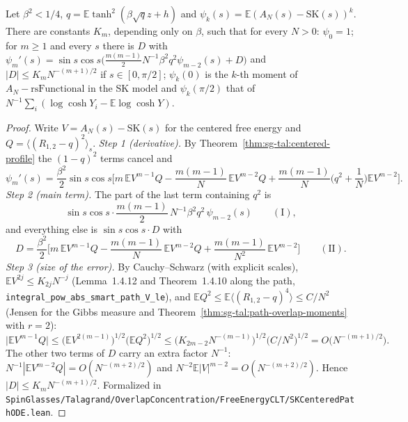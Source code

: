 \begin{theorem}\label{thm:sg-tal:centered-ode}
  \leanok
{}
Let $\beta^2<1/4$, $q=\mathbb E\tanh^2(\beta\sqrt q z+h)$ and $\psi_k(s)=\mathbb E(A_N(s)-\mathrm{SK}(s))^k$. There are constants $K_m$, depending only on $\beta$, such that for every $N>0$: $\psi_0=1$; for $m\ge1$ and every $s$ there is $D$ with $\psi_m'(s)=\sin s\cos s\big(\frac{m(m-1)}2N^{-1}\beta^2q^2\psi_{m-2}(s)+D\big)$ and $|D|\le K_mN^{-(m+1)/2}$ if $s\in[0,\pi/2]$; $\psi_k(0)$ is the $k$-th moment of $A_N-\mathrm{rsFunctional}$ in the SK model and $\psi_k(\pi/2)$ that of $N^{-1}\sum_i(\log\cosh Y_i-\mathbb E\log\cosh Y)$.
\end{theorem}
\begin{proof}
  \leanok
Write $V=A_N(s)-\mathrm{SK}(s)$ for the centered free energy and $Q=\langle(R_{1,2}-q)^2\rangle_s$.
\emph{Step 1 (derivative).} By Theorem~\ref{thm:sg-tal:centered-profile} the $(1-q)^2$ terms cancel and
\[
\psi_m'(s)=\frac{\beta^2}2\sin s\cos s\Big[m\,\mathbb{E}V^{m-1}Q-\frac{m(m-1)}N\,\mathbb{E}V^{m-2}Q+\frac{m(m-1)}N\Big(q^2+\frac1N\Big)\mathbb{E}V^{m-2}\Big].
\]
\emph{Step 2 (main term).} The part of the last term containing $q^2$ is
\[
\sin s\cos s\cdot\frac{m(m-1)}2\,N^{-1}\beta^2q^2\,\psi_{m-2}(s)\qquad(\mathrm I),
\]
and everything else is $\sin s\cos s\cdot D$ with
\[
D=\frac{\beta^2}2\Big[m\,\mathbb{E}V^{m-1}Q-\frac{m(m-1)}N\,\mathbb{E}V^{m-2}Q+\frac{m(m-1)}{N^2}\,\mathbb{E}V^{m-2}\Big]\qquad(\mathrm{II}).
\]
\emph{Step 3 (size of the error).} By Cauchy--Schwarz (with explicit scales), $\mathbb{E}V^{2j}\le K_{2j}N^{-j}$ (Lemma~1.4.12 and Theorem~1.4.10 along the path, \texttt{integral\_pow\_abs\_smart\_path\_V\_le}), and $\mathbb{E}Q^2\le\mathbb{E}\langle(R_{1,2}-q)^4\rangle\le C/N^2$ (Jensen for the Gibbs measure and Theorem~\ref{thm:sg-tal:path-overlap-moments} with $r=2$):
\[
\big|\mathbb{E}V^{m-1}Q\big|\le\big(\mathbb{E}V^{2(m-1)}\big)^{1/2}\big(\mathbb{E}Q^2\big)^{1/2}\le\big(K_{2m-2}N^{-(m-1)}\big)^{1/2}\big(C/N^2\big)^{1/2}=O\big(N^{-(m+1)/2}\big).
\]
The other two terms of $D$ carry an extra factor $N^{-1}$: $N^{-1}|\mathbb{E}V^{m-2}Q|=O(N^{-(m+2)/2})$ and $N^{-2}\mathbb{E}|V|^{m-2}=O(N^{-(m+2)/2})$. Hence $|D|\le K_mN^{-(m+1)/2}$.
Formalized in \texttt{SpinGlasses/Talagrand/OverlapConcentration/FreeEnergyCLT/SKCenteredPathODE.lean}.
\end{proof}

